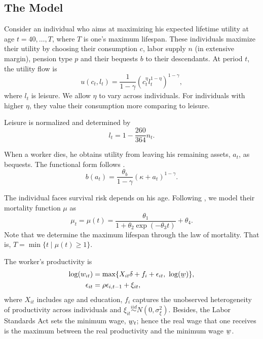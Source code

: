 \documentclass[12pt]{article}
\begin{document}
\begin{CJK*}{UTF8}{bsmi}
\section{The Model}
Consider an individual who aims at maximizing his expected 
lifetime utility at age \(t = 40,\ldots,T\), where \(T\) is 
one's maximum lifespan. These individuals maximize their 
utility by choosing their consumption \(c\), labor supply 
\(n\) (in extensive margin), pension type \(p\) and their 
bequests \(b\) to their descendants. At period \(t\), the 
utility flow is 
\begin{equation}
    u(c_t,l_t) = \frac{1}{1-\gamma}(c_t^\eta l_t^{1-\eta})^{1-\gamma},
\end{equation}
where \(l_t\) is leisure. We allow \(\eta\) to vary across 
individuals. For individuals with higher \(\eta\), they value 
their consumption more comparing to leisure.

Leisure is normalized and determined by
\begin{equation}
    l_t = 1 - \frac{260}{364}n_t.
\end{equation}

When a worker dies, he obtains utility from leaving his 
remaining assets, \(a_t\), as bequests. The functional form 
follows \cite{de-nardi2004}.
\begin{equation}
    b(a_t) = \frac{\theta_b}{1-\gamma}(\kappa+a_t)^{1-\gamma}.
\end{equation}

The individual faces survival risk depends on his age. 
Following \cite{thatcher1999}, we model their mortality 
function \(\mu\) as
\begin{equation}
    \mu_t = \mu(t) = \frac{\theta_1}{1+\theta_2\exp(-\theta_3t)} + \theta_4.
\end{equation}
Note that we determine the maximum lifespan through the law 
of mortality. That is, \(T = \min\{t\mid \mu(t) \geq 1\}\). 

The worker's productivity is
\begin{align}
    \log(w_{it}) &= \max\{X_{it}\delta + f_i + \epsilon_{it},\ \log(\underaccent{\bar}{w})\},\\
    \epsilon_{it} &= \rho\epsilon_{i,t-1} + \xi_{it},\label{eq:permanent-income-shock}
\end{align}
where \(X_{it}\) includes age and education, \(f_i\) captures 
the unobserved heterogeneity of productivity across 
individuals and \(\xi_{it}\overset{iid}{\sim}N(0,\sigma_\xi^2)\). 
Besides, the Labor Standards Act sets the minimum wage, 
\(\underaccent{\bar}{w}_t\); hence the real wage that one 
receives is the maximum between the real productivity and 
the minimum wage \(\underaccent{\bar}{w}\).


\end{CJK*}
\end{document}
